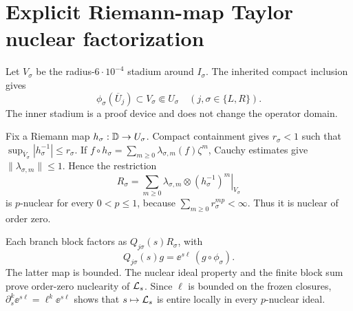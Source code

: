 \section{Explicit Riemann-map Taylor nuclear factorization}
Let \(V_\sigma\) be the radius-\(6\cdot10^{-4}\) stadium around
\(I_\sigma\). The inherited compact inclusion gives
\[
 \phi_\sigma(\overline U_j)\subset V_\sigma\Subset U_\sigma
 \quad (j,\sigma\in\{L,R\}).
\]
The inner stadium is a proof device and does not change the operator domain.

Fix a Riemann map \(h_\sigma:\mathbb{D}\to U_\sigma\). Compact containment gives
\(r_\sigma<1\) such that
\(\sup_{\overline V_\sigma}|h_\sigma^{-1}|\le r_\sigma\). If
\(f\circ h_\sigma=\sum_{m\ge0}\lambda_{\sigma,m}(f)\zeta^m\), Cauchy
estimates give \(\|\lambda_{\sigma,m}\|\le1\). Hence the restriction
\[
 R_\sigma=
 \sum_{m\ge0}\lambda_{\sigma,m}\otimes
 \left.(h_\sigma^{-1})^m\right|_{V_\sigma}
\]
is \(p\)-nuclear for every \(0<p\le1\), because
\(\sum_{m\ge0}r_\sigma^{mp}<\infty\). Thus it is nuclear of order zero.

Each branch block factors as \(Q_{j\sigma}(s)R_\sigma\), with
\[
 Q_{j\sigma}(s)g=\ee^{s\ell}\,(g\circ\phi_\sigma).
\]
The latter map is bounded. The nuclear ideal property and the finite block
sum prove order-zero nuclearity of \(\mathcal{L}_s\). Since \(\ell\) is bounded on
the frozen closures, \(\partial_s^k\ee^{s\ell}=\ell^k\ee^{s\ell}\) shows
that \(s\mapsto\mathcal{L}_s\) is entire locally in every \(p\)-nuclear ideal.
